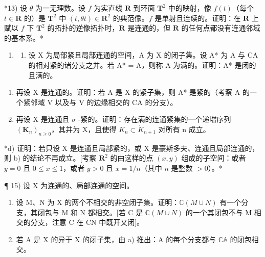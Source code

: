 *13) 设 \(\theta\) 为一无理数。设 \(f\) 为实直线 \(\mathbf{R}\) 到环面 \(\mathbf{T}^2\) 中的映射，像 \(f(t)\)（每个 \(t \in \mathbf{R}\) 的）是 \(\mathbf{T}^2\) 中 \((t, \theta t) \in \mathbf{R}^2\) 的典范像。\(f\) 是单射且连续的。证明：在 \(\mathbf{R}\) 上赋以 \(f\) 下 \(\mathbf{T}^2\) 的拓扑的逆像拓扑时，\(\mathbf{R}\) 是连通的，但 \(\mathbf{R}\) 的任何点都没有连通邻域的基本系。*

\begin{enumerate}
\def\labelenumi{\arabic{enumi})}
\setcounter{enumi}{13}
\tightlist
\item
  \begin{enumerate}
  \def\labelenumii{\alph{enumii})}
  \tightlist
  \item
    设 X 为局部紧且局部连通的空间，A 为 X 的闭子集。设 A* 为 A 与 CA 的相对紧的诸分支之并。若 A* = A，则称 A 为满的。证明：A* 是闭的且满的。
  \end{enumerate}
\end{enumerate}

\begin{enumerate}
\def\labelenumi{\alph{enumi})}
\setcounter{enumi}{1}
\item
  再设 X 是连通的。证明：若 A 是 X 的紧子集，则 A* 是紧的（考察 A 的一个紧邻域 V 以及与 V 的边缘相交的 CA 的分支）。
\item
  再设 X 是连通且 \(\sigma\) -紧的。证明：存在满的连通紧集的一个递增序列 \((\mathbf{K}_{n})_{n\geqslant0}\)，其并为 X，且使得 \(K_{n}\subset\mathring{K}_{n+1}\) 对所有 n 成立。
\end{enumerate}

*d) 证明：若只设 X 是连通且局部紧的，或 X 是豪斯多夫、连通且局部连通的，则 b) 的结论不再成立。{[}考察 \(\mathbf{R}^2\) 的由这样的点 \((x, y)\) 组成的子空间：或者 \(y = 0\) 且 \(0 \leqslant x \leqslant 1\)，或者 \(y > 0\) 且 \(x = 1/n\)（其中 \(n\) 是整数 \(> 0\)）。*

¶ 15) 设 X 为连通的、局部连通的空间。

\begin{enumerate}
\def\labelenumi{\alph{enumi})}
\item
  设 M、N 为 X 的两个不相交的非空闭子集。证明：\(\mathbb{C}(M \cup N)\) 有一个分支，其闭包与 M 和 N 都相交。{[}若 C 是 \(\mathbb{C}(M \cup N)\) 的一个其闭包不与 M 相交的分支，注意 C 在 CN 中既开又闭{]}。
\item
  若 A 是 X 的异于 X 的闭子集，由 a) 推出：A 的每个分支都与 \(\mathbb{C}\mathbb{A}\) 的闭包相交。
\end{enumerate}

